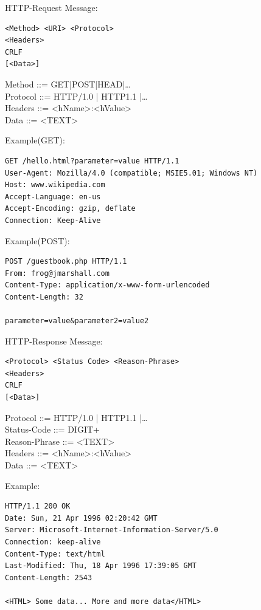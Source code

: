 \documentclass[11pt]{article}
\begin{document}
HTTP-Request Message:
\lstset{breaklines=true,language=sh,label= ,caption= ,captionpos=b,numbers=none}
\begin{lstlisting}
<Method> <URI> <Protocol>
<Headers>
CRLF
[<Data>]
\end{lstlisting}
Method ::= GET|POST|HEAD|\ldots{}\\
Protocol ::= HTTP/1.0 | HTTP1.1 |\ldots{}\\
Headers ::= <hName>:<hValue>\\
Data ::= <TEXT>

Example(GET):
\lstset{breaklines=true,language=sh,label= ,caption= ,captionpos=b,numbers=none}
\begin{lstlisting}
GET /hello.html?parameter=value HTTP/1.1
User-Agent: Mozilla/4.0 (compatible; MSIE5.01; Windows NT)
Host: www.wikipedia.com
Accept-Language: en-us
Accept-Encoding: gzip, deflate
Connection: Keep-Alive

\end{lstlisting}
Example(POST):
\lstset{breaklines=true,language=sh,label= ,caption= ,captionpos=b,numbers=none}
\begin{lstlisting}
POST /guestbook.php HTTP/1.1
From: frog@jmarshall.com
Content-Type: application/x-www-form-urlencoded
Content-Length: 32

parameter=value&parameter2=value2
\end{lstlisting}



HTTP-Response Message:
\lstset{breaklines=true,language=sh,label= ,caption= ,captionpos=b,numbers=none}
\begin{lstlisting}
<Protocol> <Status Code> <Reason-Phrase>
<Headers>
CRLF
[<Data>]
\end{lstlisting}
Protocol ::= HTTP/1.0 | HTTP1.1 |\ldots{}\\
Status-Code ::= DIGIT+\\
Reason-Phrase ::= <TEXT>\\
Headers ::= <hName>:<hValue>\\
Data ::= <TEXT>

Example:
\lstset{breaklines=true,language=sh,label= ,caption= ,captionpos=b,numbers=none}
\begin{lstlisting}
HTTP/1.1 200 OK
Date: Sun, 21 Apr 1996 02:20:42 GMT
Server: Microsoft-Internet-Information-Server/5.0
Connection: keep-alive
Content-Type: text/html
Last-Modified: Thu, 18 Apr 1996 17:39:05 GMT
Content-Length: 2543

<HTML> Some data... More and more data</HTML>
\end{lstlisting}
\end{document}
